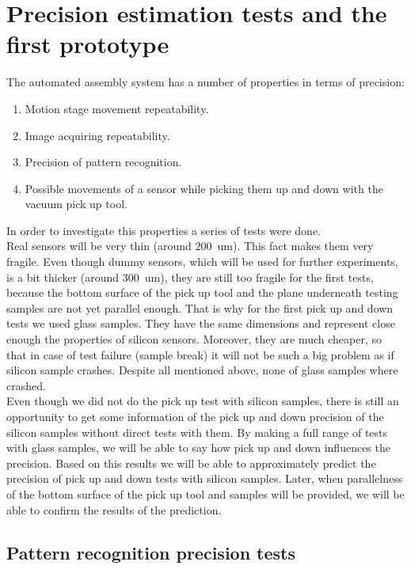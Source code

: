 \chapter{Precision estimation tests and the first prototype}
The automated assembly system has a number of properties in terms of precision:
\begin{enumerate}
\setlength\itemsep{-0.5em}
\item Motion stage movement repeatability.
\item Image acquiring repeatability.
\item Precision of pattern recognition.
\item Possible movements of a sensor while picking them up and down with the vacuum pick up tool.
\end{enumerate}

In order to investigate this properties a series of tests were done.
\\Real sensors will be very thin (around 200~um). This fact makes them very fragile. Even though dummy sensors, which will be used for further experiments, is a bit thicker (around 300~um), they are still too fragile for the first tests, because the bottom surface of the pick up tool and the plane underneath testing samples are not yet parallel enough. That is why for the first pick up and down tests we used glass samples. They have the same dimensions and represent close enough the properties of silicon sensors. Moreover, they are much cheaper, so that in case of test failure (sample break) it will not be such a big problem as if silicon sample crashes. Despite all mentioned above, none of glass samples where crashed.
\\Even though we did not do the pick up test with silicon samples, there is still an opportunity to get some information of the pick up and down precision of the silicon samples without direct tests with them. By making a full range of tests with glass samples, we will be able to say how pick up and down influences the precision. Based on this results we will be able to approximately predict the precision of pick up and down tests with silicon samples. Later, when parallelness of the bottom surface of the pick up tool and samples will be provided, we will be able to confirm the results of the prediction.

\section{Pattern recognition precision tests}

